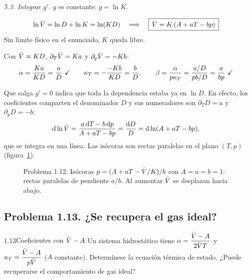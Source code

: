 \begin{resolucion}
\emph{5.3. Integrar $g'$.} $g$ es constante: $g=\ln K$.

\[
  \ln\bar{V}=\ln D+\ln K=\ln(KD)\quad\Longrightarrow\quad\boxed{\,\bar{V}=K\,(A+aT-bp)\,}
\]
Sin límite físico en el enunciado, $K$ queda libre.

 Con $\bar{V}=KD$, $\partial_T\bar{V}=Ka$ y $\partial_p\bar{V}=-Kb$:
\[
  \alpha=\frac{Ka}{KD}=\frac aD\ \checkmark\qquad\kappa_T=-\frac{-Kb}{KD}=\frac bD,\qquad
  \beta=\frac{\alpha}{p\kappa_T}=\frac{a/D}{pb/D}=\frac{a}{bp}\ \checkmark
\]
\end{resolucion}

\begin{observacion}[El atajo]
Que salga $g'=0$ indica que toda la dependencia estaba ya en $\ln D$. En efecto, los coeficientes
comparten el denominador $D$ y sus numeradores son $\partial_TD=a$ y $\partial_pD=-b$:
\[
  \mathrm{d}\ln\bar{V}=\frac{a\,\mathrm{d} T-b\,\mathrm{d} p}{A+aT-bp}=\frac{\mathrm{d} D}{D}=\mathrm{d}\ln(A+aT-bp),
\]
que se integra en una línea. Las isócoras son rectas paralelas en el plano $(T,p)$ (figura~\ref{fig:p112}).
\end{observacion}

\begin{figure}[htbp]
\centering
{}
\caption{Problema 1.12. Isócoras $p=(A+aT-\bar{V}/K)/b$ con $A=a=b=1$: rectas paralelas de pendiente
$a/b$. Al aumentar $\bar{V}$ se desplazan hacia abajo.}
\label{fig:p112}
\end{figure}

\subsection{Problema 1.13. ¿Se recupera el gas ideal?}
\begin{problema}{1.13}{Coeficientes con $\bar{V}-A$}
Un sistema hidrostático tiene $\displaystyle\alpha=\frac{\bar{V}-A}{2\bar{V} T}$ y
$\displaystyle\kappa_T=\frac{\bar{V}-A}{p\bar{V}}$ ($A$ constante). Determínese la ecuación térmica de estado.
¿Puede recuperarse el comportamiento de gas ideal?
\end{problema}

